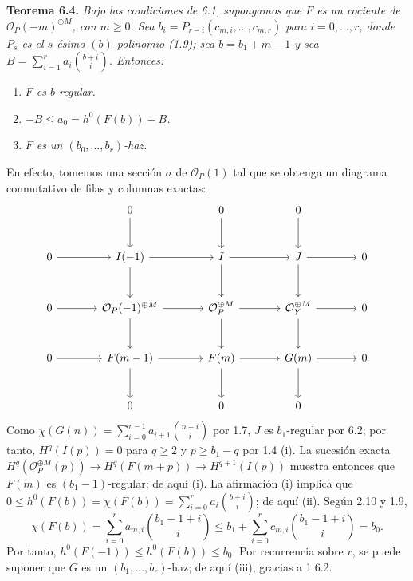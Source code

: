 \textbf{Teorema 6.4.} \emph{Bajo las condiciones de 6.1, supongamos que $F$
es un cociente de $\mathcal O_P(-m)^{\oplus M}$, con $m\geq0$. Sea
$b_i=P_{r-i}(c_{m,i},\ldots,c_{m,r})$ para $i=0,\ldots,r$, donde $P_s$ es
el $s$-ésimo $(b)$-polinomio (1.9); sea $b=b_1+m-1$ y sea
$B=\sum_{i=1}^{r}a_i\binom{b+i}{i}$. Entonces:}
\begin{enumerate}[label=(\roman*)]
\item \emph{$F$ es $b$-regular.}
\item \emph{$-B\leq a_0=h^0(F(b))-B$.}
\item \emph{$F$ es un $(b_0,\ldots,b_r)$-haz.}
\end{enumerate}

En efecto, tomemos una sección $\sigma$ de $\mathcal O_P(1)$ tal que se
obtenga un diagrama conmutativo de filas y columnas exactas:
\[
\begin{tikzcd}[column sep=large,row sep=large]
&0 \arrow[d]&0 \arrow[d]&0 \arrow[d]&\\
0 \arrow[r]&I(-1) \arrow[r] \arrow[d]&I \arrow[r] \arrow[d]&J \arrow[r]
\arrow[d]&0\\
0 \arrow[r]&\mathcal O_P(-1)^{\oplus M} \arrow[r] \arrow[d]&
\mathcal O_P^{\oplus M} \arrow[r] \arrow[d]&
\mathcal O_Y^{\oplus M} \arrow[r] \arrow[d]&0\\
0 \arrow[r]&F(m-1) \arrow[r] \arrow[d]&F(m) \arrow[r] \arrow[d]&
G(m) \arrow[r] \arrow[d]&0\\
&0&0&0&
\end{tikzcd}
\]
Como $\chi(G(n))=\sum_{i=0}^{r-1}a_{i+1}\binom{n+i}{i}$ por 1.7, $J$ es
$b_1$-regular por 6.2; por tanto, $H^q(I(p))=0$ para $q\geq2$ y
$p\geq b_1-q$ por 1.4 (i). La sucesión exacta
$H^q(\mathcal O_P^{\oplus M}(p))\longrightarrow H^q(F(m+p))
\longrightarrow H^{q+1}(I(p))$ muestra entonces que $F(m)$ es
$(b_1-1)$-regular; de aquí (i). La afirmación (i) implica que
$0\leq h^0(F(b))=\chi(F(b))=
\sum_{i=0}^{r}a_i\binom{b+i}{i}$; de aquí (ii). Según 2.10 y 1.9,
\[
\chi(F(b))=\sum_{i=0}^{r}a_{m,i}\binom{b_1-1+i}{i}
\leq b_1+\sum_{i=0}^{r}c_{m,i}\binom{b_1-1+i}{i}=b_0.
\]
Por tanto, $h^0(F(-1))\leq h^0(F(b))\leq b_0$. Por recurrencia sobre $r$,
se puede suponer que $G$ es un $(b_1,\ldots,b_r)$-haz; de aquí (iii),
gracias a 1.6.2.


